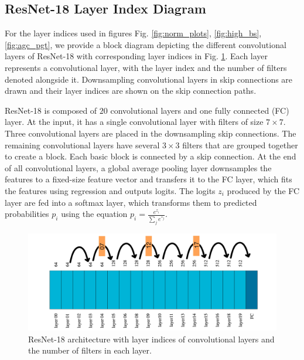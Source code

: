 \documentclass[times,sort&compress]{elsarticle}
\begin{document}
\clearpage


\subsection{ResNet-18 Layer Index Diagram}

For the layer indices used in figures Fig. \ref{fig:norm_plots}, \ref{fig:high_bs},
\ref{fig:agc_pgt}, we provide a block diagram depicting the different convolutional
layers of ResNet-18 with corresponding layer indices in Fig. \ref{fig:resnet18}. Each
layer represents a convolutional layer, with the layer index and the number of filters
denoted alongside it. Downsampling convolutional layers in skip connections are drawn
and their layer indices are shown on the skip connection paths.


ResNet-18 is composed of $20$ convolutional layers and one fully connected (FC) layer.
At the input, it has a single convolutional layer with filters of size $7\times 7$.
Three convolutional layers are placed in the downsampling skip connections. The
remaining convolutional layers have several $3\times 3$ filters that are grouped
together to create a block. Each basic block is connected by a skip connection. At the
end of all convolutional layers, a global average pooling layer downsamples the features
to a fixed-size feature vector and transfers it to the FC layer, which fits the features
using regression and outputs logits. The logits $z_i$ produced by the FC layer are fed
into a softmax layer, which transforms them to predicted probabilities $p_i$ using the
equation $p_i=\frac {e^{z_i}}{\sum _j e^{z_j}}$.


\begin{figure}[ht] \centering \includegraphics[width=0.96\columnwidth]{drawing}
\caption{ ResNet-18 architecture with layer indices of convolutional layers and the
number of filters in each layer. } \label{fig:resnet18} \end{figure}
\end{document}
